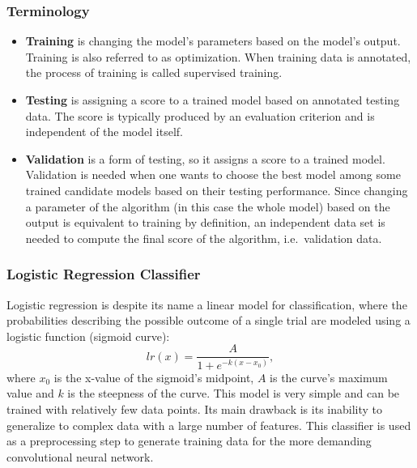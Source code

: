 		\subsubsection{Terminology}
			\begin{itemize} 
				\item \textbf{Training} is changing the model's parameters based on the model's output. Training is also referred to as optimization. When training data is annotated, the process of training is called supervised training. 
				\item \textbf{Testing} is assigning a score to a trained model based on annotated testing data. The score is typically produced by an evaluation criterion and is independent of the model itself. 
				\item \textbf{Validation} is a form of testing, so it assigns a score to a trained model. Validation is needed when one wants to choose the best model among some trained candidate models based on their testing performance. Since changing a parameter of the algorithm (in this case the whole model) based on the output is equivalent to training by definition, an independent data set is needed to compute the final score of the algorithm, i.e.\ validation data. 
			\end{itemize}				
			
		\subsubsection{Logistic Regression Classifier}
			Logistic regression is despite its name a linear model for classification, where the probabilities describing the possible outcome of a single trial are modeled using a logistic function (sigmoid curve):
			\begin{equation}
				lr(x) = \dfrac{A}{1 + e^{-k (x-x_0)}},
			\end{equation}
		where $x_0$ is the x-value of the sigmoid's midpoint, $A$ is the curve's maximum value and $k$ is the steepness of the curve. This model is very simple and can be trained with relatively few data points. Its main drawback is its inability to generalize to complex data with a large number of features. This classifier is used as a preprocessing step to generate training data for the more demanding convolutional neural network. 
		
